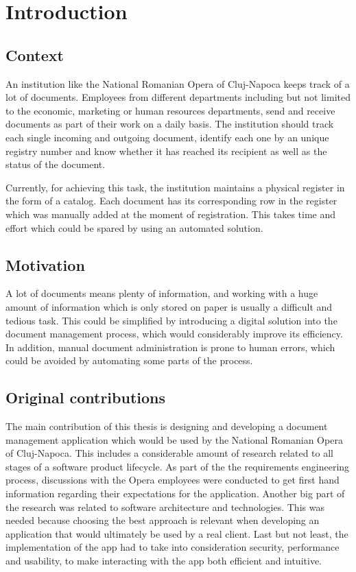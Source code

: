 \chapter{Introduction}
\label{chapter:introduction}

\section{Context}
\label{section:context}

An institution like the National Romanian Opera of Cluj-Napoca keeps track of a lot of documents.
Employees from different departments including but not limited to the economic, marketing or human resources departments, send and receive documents as part of their work on a daily basis. The institution should track each single incoming and outgoing document, identify each one by an unique registry number and know whether it has reached its recipient as well as the status of the document.

Currently, for achieving this task, the institution maintains a physical register in the form of a catalog. Each document has its corresponding row in the register which was manually added at the moment of registration. This takes time and effort which could be spared by using an automated solution.

\section{Motivation}
\label{section:motivation}

A lot of documents means plenty of information, and working with a huge amount of information which is only stored on paper is usually a difficult and tedious task. This could be simplified by introducing a digital solution into the document management process, which would considerably improve its efficiency. In addition, manual document administration is prone to human errors, which could be avoided by automating some parts of the process.



\section{Original contributions}
\label{section:originalContributions}

The main contribution of this thesis is designing and developing a document management application which would be used by the National Romanian Opera of Cluj-Napoca. This includes a considerable amount of research related to all stages of a software product lifecycle. As part of the the requirements engineering process, discussions with the Opera employees were conducted to get first hand information regarding their expectations for the application. Another big part of the research was related to software architecture and technologies. This was needed because choosing the best approach is relevant when developing an application that would ultimately be used by a real client. Last but not least, the implementation of the app had to take into consideration security, performance and usability, to make interacting with the app both efficient and intuitive.

